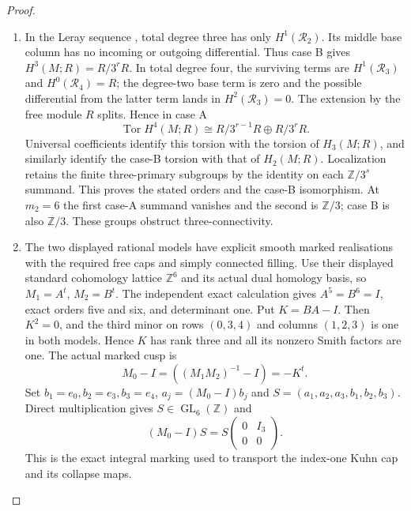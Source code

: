 \documentclass[11pt,a4paper]{article}
\theoremstyle{definition}
\begin{document}
\begin{proof}
\begin{enumerate}[label=\arabic*.]
For $q=2,3$ there is consequently an exact sequence
\[
 0\longrightarrow\mathcal R_q\longrightarrow j_*L_q
 \longrightarrow Q_q\longrightarrow0,
\]
where $Q_q$ is supported at the second finite point.  Since
$H^0(j_*L_q)=0$, its connecting map embeds $Q_q$ in
$H^1(\mathcal R_q)$, with the free quotient $H^1(j_*L_q)$
computed above.  Its torsion is exactly $Q_q$.
Also $H^2(\mathcal R_1)=H^2(\mathcal R_2)=H^2(\mathcal R_3)=0$.
Injectivity gives $H^0(\mathcal R_3)=0$.  The degree-four
free cusp kernel, together with $H^0(j_*L_4)=0$, gives
$H^0(\mathcal R_4)=R$.

\item In the Leray sequence
\cite[Tag~01F2, Lemma~20.13.4]{StacksProject}, total degree three
has only $H^1(\mathcal R_2)$.  Its middle base column has no
incoming or outgoing differential.  Thus case B gives
$H^3(M;R)=R/3^rR$.
In total degree four, the surviving terms are
$H^1(\mathcal R_3)$ and $H^0(\mathcal R_4)=R$;
the degree-two base term is zero and the possible differential
from the latter term lands in $H^2(\mathcal R_3)=0$.
The extension by the free module $R$ splits.  Hence in case A
\[
 \operatorname{Tor}H^4(M;R)
   \cong R/3^{r-1}R\oplus R/3^rR.
\]
Universal coefficients
\cite[Theorem~3.2, p.~195]{Hatcher2002} identify this torsion
with the torsion of $H_3(M;R)$, and similarly identify the
case-B torsion with that of $H_2(M;R)$.  Localization retains
the finite three-primary subgroups by the identity on each
$\mathbb Z/3^s$ summand.  This proves the stated orders and
the case-B isomorphism.  At $m_2=6$ the first case-A summand
vanishes and the second is $\mathbb Z/3$; case B is also
$\mathbb Z/3$.  These groups obstruct three-connectivity.
\item The two displayed rational models have explicit smooth marked
realisations with the required free caps and simply connected filling.
Use their displayed standard cohomology lattice $\mathbb Z^6$ and its
actual dual homology basis, so $M_1=A^t$, $M_2=B^t$.
The independent exact calculation gives $A^5=B^6=I$, exact orders five
and six, and determinant one. Put $K=BA-I$. Then $K^2=0$, and the
third minor on rows $(0,3,4)$ and columns $(1,2,3)$ is one in both
models. Hence $K$ has rank three and all its nonzero Smith factors
are one. The actual marked cusp is
\[
 M_0-I=((M_1M_2)^{-1}-I)=-K^t.
\]
Set $b_1=e_0,b_2=e_3,b_3=e_4$, $a_j=(M_0-I)b_j$ and
$S=(a_1,a_2,a_3,b_1,b_2,b_3)$. Direct multiplication gives
$S\in\operatorname{GL}_6(\mathbb Z)$ and
\[
 (M_0-I)S=S\begin{pmatrix}0&I_3\\0&0\end{pmatrix}.
\]
This is the exact integral marking used to transport the index-one
Kuhn cap and its collapse maps.


\end{enumerate}
\end{proof}
\end{document}
